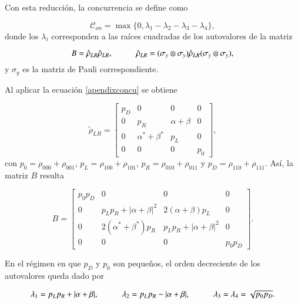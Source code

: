 \begin{appendixs}
Con esta reducción, la concurrencia se define como

\begin{equation*}
    \mathcal{C}_{on} = \max \{ 0,\lambda_{1} - \lambda_{2} - \lambda_{3} - \lambda_{4} \},
\end{equation*}
donde los $\lambda_{i}$ corresponden a las raíces cuadradas de los autovalores de la matriz

\begin{equation}
    B = \hat{\rho}_{LR} \tilde{\rho}_{LR}, 
    \hspace{10mm} 
    \tilde{\rho}_{LR} = (\sigma_{y} \otimes \sigma_{y}) \hat{\rho}_{LR} (\sigma_{y} \otimes \sigma_{y}),
    \label{apendixconcu}
\end{equation}
y $\sigma_{y}$ es la matriz de Pauli correspondiente.  

Al aplicar la ecuación \eqref{apendixconcu} se obtiene

\begin{equation*}
    \tilde{\rho}_{LR} = 
    \begin{bmatrix}
        p_{D} & 0 & 0 & 0  \\
        0 & p_{R} & \alpha + \beta & 0  \\
        0 & \alpha^{*} + \beta^{*} & p_{L} & 0  \\
        0 & 0 & 0 & p_{0} 
        \end{bmatrix},
\end{equation*}
con  $p_{0}=\rho_{000}+\rho_{001}$, $p_{L}=\rho_{100} + \rho_{101}$, $p_{R}=\rho_{010}+\rho_{011}$ y $p_{D}=\rho_{110}+\rho_{111}$. Así, la matriz $B$ resulta

\begin{equation*}
    B = 
    \begin{bmatrix}
        p_{0}p_{D} & 0 & 0 & 0  \\
        0 & p_{L}p_{R}+|\alpha+\beta|^{2} & 2(\alpha + \beta)p_{L} & 0  \\
        0 & 2(\alpha^{*} + \beta^{*})p_{R} & p_{L}p_{R}+|\alpha+\beta|^{2}  & 0  \\
        0 & 0 & 0 & p_{0}p_{D}
        \end{bmatrix}.
\end{equation*}

En el régimen en que $p_{D}$ y $p_{0}$ son pequeños, el orden decreciente de los autovalores queda dado por

\begin{equation*}
    \lambda_{1} = p_{L}p_{R} + |\alpha + \beta|, 
    \hspace{10mm}  
    \lambda_{2} = p_{L}p_{R} - |\alpha + \beta|, 
    \hspace{10mm}  
    \lambda_{3}=\lambda_{4} = \sqrt{p_{0}p_{D}}.
\end{equation*}


\end{appendixs}
